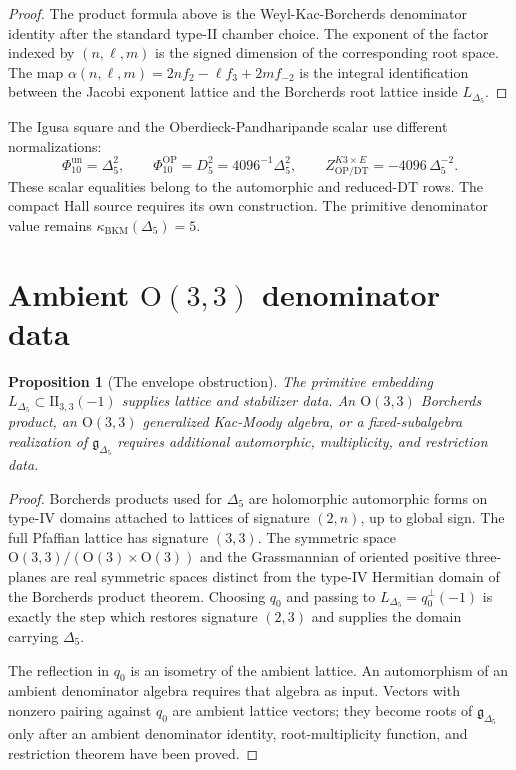 \documentclass[11pt]{article}
\providecommand{\OO}{\mathrm{O}}
\providecommand{\II}{\mathrm{II}}
\providecommand{\kBKM}{\kappa_{\mathrm{BKM}}}
\providecommand{\Dfive}{D_5}
\providecommand{\PhiTen}{\Phi_{10}^{\mathrm{un}}}
\theoremstyle{plain}
\newtheorem{proposition}[theorem]{Proposition}
\theoremstyle{definition}
\begin{document}
\begin{proof}
The product formula above is the Weyl-Kac-Borcherds denominator
identity after the standard type-II chamber choice.  The exponent of
the factor indexed by $(n,\ell,m)$ is the signed dimension of the
corresponding root space.  The map
\(\alpha(n,\ell,m)=2nf_2-\ell f_3+2mf_{-2}\) is the integral
identification between the Jacobi exponent lattice and the Borcherds
root lattice inside $L_{\Delta_5}$.
\end{proof}

The Igusa square and the Oberdieck-Pandharipande scalar use different
normalizations:
\[
\PhiTen=\Delta_5^2,\qquad
\Phi_{10}^{\mathrm{OP}}=\Dfive^2=4096^{-1}\Delta_5^2,\qquad
Z_{\mathrm{OP/DT}}^{K3\times E}=-4096\,\Delta_5^{-2}.
\]
These scalar equalities belong to the automorphic and reduced-DT rows.
The compact Hall source requires its own construction.  The primitive
denominator value remains \(\kBKM(\Delta_5)=5\).

\section{\texorpdfstring{Ambient $\OO(3,3)$ denominator data}{Ambient O(3,3) denominator data}}

\begin{proposition}[The envelope obstruction]
\label{prop:envelope-obstruction}
The primitive embedding $L_{\Delta_5}\subset\II_{3,3}(-1)$ supplies
lattice and stabilizer data.  An $\OO(3,3)$ Borcherds product, an
$\OO(3,3)$ generalized Kac-Moody algebra, or a fixed-subalgebra
realization of $\mathfrak g_{\Delta_5}$ requires additional
automorphic, multiplicity, and restriction data.
\end{proposition}

\begin{proof}
Borcherds products used for $\Delta_5$ are holomorphic automorphic
forms on type-IV domains attached to lattices of signature $(2,n)$, up
to global sign.  The full Pfaffian lattice has signature $(3,3)$.  The
symmetric space $\OO(3,3)/(\OO(3)\times\OO(3))$ and the Grassmannian of
oriented positive three-planes are real symmetric spaces distinct from
the type-IV Hermitian domain of the Borcherds product theorem.  Choosing
$q_0$ and passing to $L_{\Delta_5}=q_0^\perp(-1)$ is exactly the step
which restores signature $(2,3)$ and supplies the domain carrying
$\Delta_5$.

The reflection in $q_0$ is an isometry of the ambient lattice.  An
automorphism of an ambient denominator algebra requires that algebra as
input.  Vectors with nonzero pairing against $q_0$ are ambient lattice
vectors; they become roots of $\mathfrak g_{\Delta_5}$ only after an
ambient denominator identity, root-multiplicity function, and
restriction theorem have been proved.
\end{proof}
\end{document}
